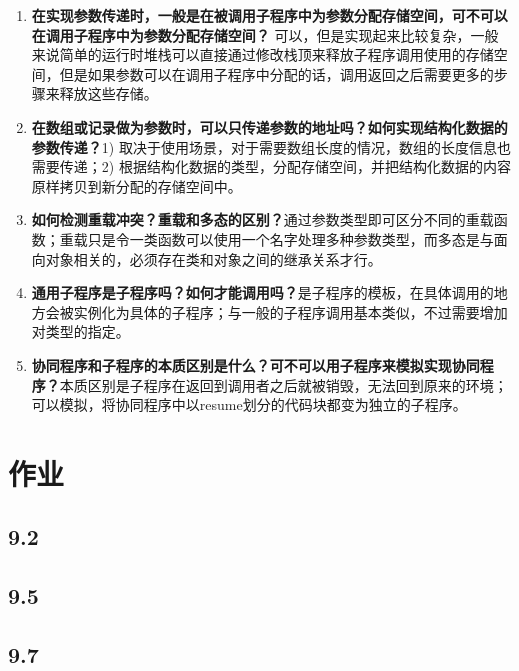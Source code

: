 \documentclass[a4paper,12pt]{article}
\begin{document}
\begin{enumerate}
\item \textbf{在实现参数传递时，一般是在被调用子程序中为参数分配存储空间，可不可以在调用子程序中为参数分配存储空间？} 可以，但是实现起来比较复杂，一般来说简单的运行时堆栈可以直接通过修改栈顶来释放子程序调用使用的存储空间，但是如果参数可以在调用子程序中分配的话，调用返回之后需要更多的步骤来释放这些存储。
\item \textbf{在数组或记录做为参数时，可以只传递参数的地址吗？如何实现结构化数据的参数传递？}1) 取决于使用场景，对于需要数组长度的情况，数组的长度信息也需要传递；2) 根据结构化数据的类型，分配存储空间，并把结构化数据的内容原样拷贝到新分配的存储空间中。
\item \textbf{如何检测重载冲突？重载和多态的区别？}通过参数类型即可区分不同的重载函数；重载只是令一类函数可以使用一个名字处理多种参数类型，而多态是与面向对象相关的，必须存在类和对象之间的继承关系才行。
\item \textbf{通用子程序是子程序吗？如何才能调用吗？}是子程序的模板，在具体调用的地方会被实例化为具体的子程序；与一般的子程序调用基本类似，不过需要增加对类型的指定。
\item \textbf{协同程序和子程序的本质区别是什么？可不可以用子程序来模拟实现协同程序？}本质区别是子程序在返回到调用者之后就被销毁，无法回到原来的环境；可以模拟，将协同程序中以resume划分的代码块都变为独立的子程序。
\end{enumerate}

\section{作业}

\subsection{9.2}

\subsection{9.5}

\subsection{9.7}
\end{document}
